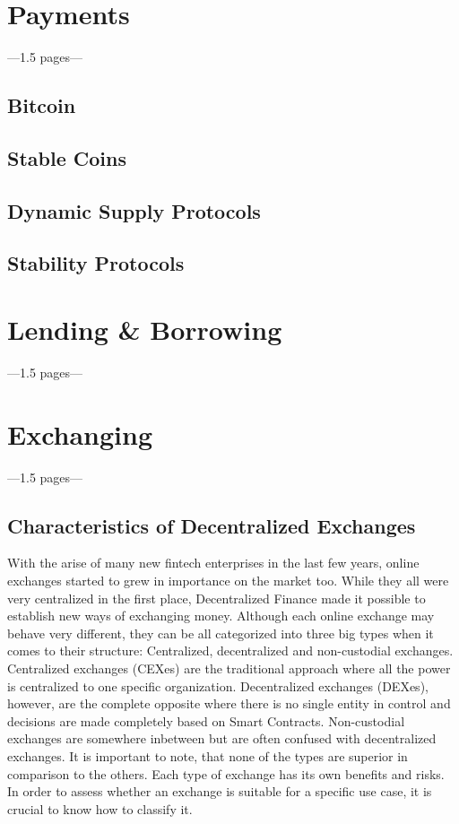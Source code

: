 \section{Payments}
---1.5 pages---
\subsection{Bitcoin}
\subsection{Stable Coins}
\subsection{Dynamic Supply Protocols}
\subsection{Stability Protocols}

\section{Lending \& Borrowing}
---1.5 pages---

\section{Exchanging}
---1.5 pages---
\subsection{Characteristics of Decentralized Exchanges}
With the arise of many new fintech enterprises in the last few years, online exchanges started to grew in importance on the market too. While they all were very centralized in the first place, Decentralized Finance made it possible to establish new ways of exchanging money. Although each online exchange may behave very different, they can be all categorized into three big types when it comes to their structure: Centralized, decentralized and non-custodial exchanges. Centralized exchanges (CEXes) are the traditional approach where all the power is centralized to one specific organization. Decentralized exchanges (DEXes), however, are the complete opposite where there is no single entity in control and decisions are made completely based on Smart Contracts. Non-custodial exchanges are somewhere inbetween but are often confused with decentralized exchanges. It is important to note, that none of the types are superior in comparison to the others. Each type of exchange has its own benefits and risks. In order to assess whether an exchange is suitable for a specific use case, it is crucial to know how to classify it.

